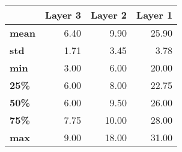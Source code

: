 \begin{tabular}{lrrr}
\toprule
{} &  Layer 3 &  Layer 2 &  Layer 1 \\
\midrule
\textbf{mean} &     6.40 &     9.90 &    25.90 \\
\textbf{std } &     1.71 &     3.45 &     3.78 \\
\textbf{min } &     3.00 &     6.00 &    20.00 \\
\textbf{25\% } &     6.00 &     8.00 &    22.75 \\
\textbf{50\% } &     6.00 &     9.50 &    26.00 \\
\textbf{75\% } &     7.75 &    10.00 &    28.00 \\
\textbf{max } &     9.00 &    18.00 &    31.00 \\
\bottomrule
\end{tabular}
